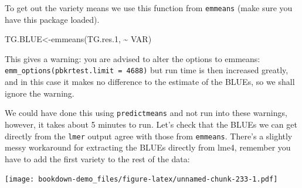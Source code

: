 \documentclass[
]{book}
\newenvironment{Shaded}{\begin{snugshade}}{\end{snugshade}}
\newcommand{\CommentTok}[1]{\textcolor[rgb]{0.56,0.35,0.01}{\textit{#1}}}
\newcommand{\DecValTok}[1]{\textcolor[rgb]{0.00,0.00,0.81}{#1}}
\newcommand{\FloatTok}[1]{\textcolor[rgb]{0.00,0.00,0.81}{#1}}
\newcommand{\FunctionTok}[1]{\textcolor[rgb]{0.00,0.00,0.00}{#1}}
\newcommand{\NormalTok}[1]{#1}
\newcommand{\OtherTok}[1]{\textcolor[rgb]{0.56,0.35,0.01}{#1}}
\newcommand{\SpecialCharTok}[1]{\textcolor[rgb]{0.00,0.00,0.00}{#1}}
\newcommand{\StringTok}[1]{\textcolor[rgb]{0.31,0.60,0.02}{#1}}
\begin{document}
To get out the variety means we use this function from \texttt{emmeans} (make sure you have this package loaded).

\begin{Shaded}
\begin{Highlighting}[]
\NormalTok{TG.BLUE}\OtherTok{\textless{}{-}}\FunctionTok{emmeans}\NormalTok{(TG.res}\FloatTok{.1}\NormalTok{, }\SpecialCharTok{\textasciitilde{}}\NormalTok{ VAR)}
\end{Highlighting}
\end{Shaded}

This gives a warning: you are advised to alter the options to emmeans: \texttt{emm\_options(pbkrtest.limit\ =\ 4688)} but run time is then increased greatly, and in this case it makes no difference to the estimate of the BLUEs, so we shall ignore the warning.

We could have done this using \texttt{predictmeans} and not run into these warnings, however, it takes about 5 minutes to run. Let's check that the BLUEs we can get directly from the \texttt{lmer} output agree with those from \texttt{emmeans}. There's a slightly messy workaround for extracting the BLUEs directly from lme4, remember you have to add the first variety to the rest of the data:

\begin{Shaded}
\end{Shaded}

\texttt{[image: bookdown-demo\_files/figure-latex/unnamed-chunk-233-1.pdf]}
\end{document}
